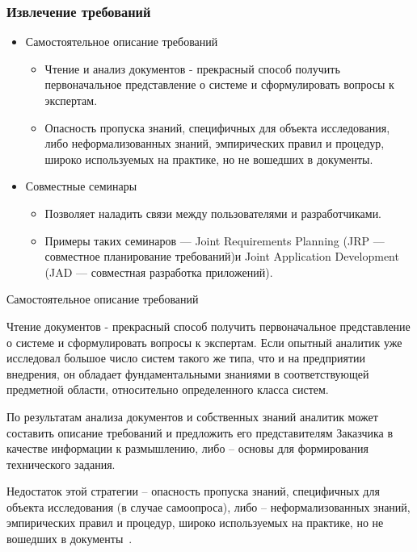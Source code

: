 \documentclass{../industrial-development}
\begin{document}
\begin{frame} \frametitle{Извлечение требований}
\begin{itemize}

\item \alert{Самостоятельное описание требований}
\begin{itemize} 
\item Чтение и анализ документов - прекрасный способ получить первоначальное представление о системе и сформулировать вопросы к экспертам.
\item Опасность пропуска знаний, специфичных для объекта исследования, либо неформализованных знаний, эмпирических правил и процедур, широко используемых на практике, но не вошедших в документы.
\end{itemize}

\item \alert{Совместные семинары}
\begin{itemize} 
\item Позволяет наладить связи между пользователями и разработчиками.
\item Примеры таких семинаров — Joint Requirements Planning (JRP — совместное планирование требований)и Joint Application Development (JAD — совместная разработка приложений).
\end{itemize}

\end{itemize}
\end{frame}
\lecturenotes

\alert{Самостоятельное описание требований}

Чтение документов - прекрасный способ получить первоначальное представление о системе и сформулировать вопросы к экспертам. Если опытный аналитик уже исследовал большое число систем такого же типа, что и на предприятии внедрения, он обладает фундаментальными знаниями в соответствующей предметной области, относительно определенного класса систем.

По результатам анализа документов и собственных знаний аналитик может составить описание требований и предложить его представителям Заказчика в качестве информации к размышлению, либо – основы для формирования технического задания.

Недостаток этой стратегии – опасность пропуска знаний, специфичных для объекта исследования (в случае самоопроса), либо – неформализованных знаний, эмпирических правил и процедур, широко используемых на практике, но не вошедших в документы~\cite[с.~33]{Maglinec}.
\end{document}
